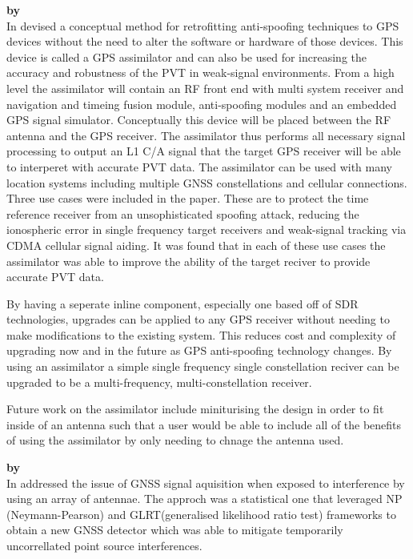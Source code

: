 \medskip

\textbf{\emph{} by \citeauthor{RN19}} \\
In \citeyear{RN19} \citeauthor{RN19} \cite{RN19} devised a conceptual method for retrofitting anti-spoofing techniques to GPS devices without the need
to alter the software or hardware of those devices. This device is called a GPS assimilator and can also be used for increasing the accuracy and robustness
of the PVT in weak-signal environments. From a high level the assimilator will contain an RF front end with multi system receiver and navigation and timeing fusion module,  
anti-spoofing modules and an embedded GPS signal simulator. Conceptually this device will be placed between the RF antenna and the GPS receiver. The assimilator thus performs
all necessary signal processing to output an L1 C/A signal that the target GPS receiver will be able to interperet with accurate PVT data. The assimilator
can be used with many location systems including multiple GNSS constellations and cellular connections. Three use cases were included in the paper.
These are to protect the time reference receiver from an unsophisticated spoofing attack, reducing the ionospheric error in single frequency target
receivers and weak-signal tracking via CDMA cellular signal aiding. It was found that in each of these use cases the assimilator was able to improve
the ability of the target reciver to provide accurate PVT data.

By having a seperate inline component, especially one based off of SDR technologies, upgrades can be applied to any GPS receiver without needing to
make modifications to the existing system. This reduces cost and complexity of upgrading now and in the future as GPS anti-spoofing technology changes.
By using an assimilator a simple single frequency single constellation reciver can be upgraded to be a multi-frequency, multi-constellation receiver.

Future work on the assimilator include miniturising the design in order to fit inside of an antenna such that a user would be able to include all of the 
benefits of using the assimilator by only needing to chnage the antenna used. 

\medskip

\textbf{\emph{} by \citeauthor{RN20}} \\
In  \citeauthor{RN20} \cite{RN20} addressed the issue of GNSS signal aquisition when exposed to interference by using an array of antennae.
The approch was a statistical one that leveraged NP (Neymann-Pearson) and GLRT(generalised likelihood ratio test) frameworks to obtain a new GNSS detector 
which was able to mitigate temporarily uncorrellated point source interferences. 


